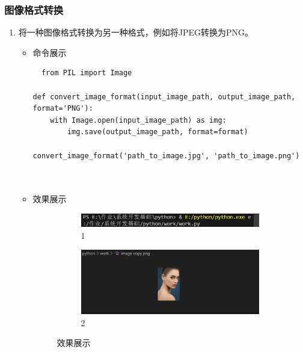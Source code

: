 \documentclass[UTF8]{ctexart}
\begin{document}
\subsubsection{图像格式转换}

\begin{enumerate}
  \item 将一种图像格式转换为另一种格式，例如将JPEG转换为PNG。
  \begin{itemize}
  \item 命令展示
  \begin{verbatim}
  from PIL import Image

def convert_image_format(input_image_path, output_image_path, format='PNG'):
    with Image.open(input_image_path) as img:
        img.save(output_image_path, format=format)

convert_image_format('path_to_image.jpg', 'path_to_image.png')

    
  \end{verbatim}

\item 效果展示
 \begin{figure}[H]
    \centering
    \begin{subfigure}[b]{0.48\textwidth} %
        \includegraphics[width=\textwidth]{321} %
        \caption{1}
        \label{fig:left}
    \end{subfigure}
    \hfill
    \begin{subfigure}[b]{0.48\textwidth} %
        \includegraphics[width=\textwidth]{322} %
        \caption{2}
        \label{fig:right}
    \end{subfigure}
    \caption{效果展示}
    \label{fig:two_images}
\end{figure}

  \end{itemize}
\end{enumerate}
\end{document}
